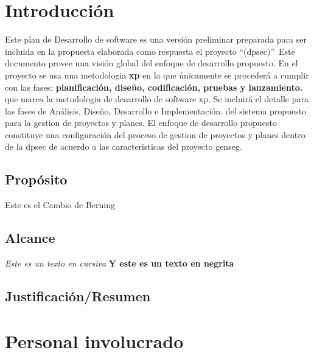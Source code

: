 \documentclass[12pt,a4paper]{article}
\begin{document}


\tableofcontents %
\listoffigures
\listoftables
\pagestyle{fancy} \mystyle \newpage %




\section{Introducción }
Este plan de Desarrollo de software es una versión preliminar preparada para ser incluida 
en la propuesta elaborada como respuesta el proyecto \textquotedblleft(\gls{dpsec})\textquotedblright \ Este documento
provee una visión global del enfoque de desarrollo propuesto.
\espacio
En el proyecto se usa una metodologia \textbf{\gls{xp}} en la que únicamente
se procederá a cumplir con las fases: \textbf{planificación, diseño, codificación, pruebas y lanzamiento.}
que marca la metodologia de desarrollo de software \gls{xp}.
Se incluirá el detalle para las fases de Análisis, Diseño, Desarrollo e Implementación.
del sistema propuesto para la gestion de proyectos y planes.
\espacio
El enfoque de desarrollo propuesto constituye una configuración del proceso
de gestion de proyectos y planes dentro de la \gls{dpsec} de acuerdo a las 
caracteristicas del proyecto \gls{genseg}. 

\subsection{Propósito } 
Este es el Cambio de Berning
\subsection{Alcance}
 \textit{Este es un texto en cursiva}
 \espacio
 \textbf{Y este es un texto en negrita }
\subsection{Justificación/Resumen}


\section{Personal involucrado}
\end{document}
